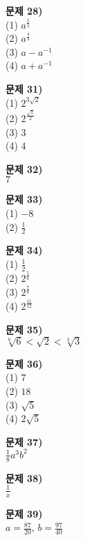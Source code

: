 \documentclass{oblivoir}
\newcommand\an[1]{\par\bigskip\noindent\textbf{문제 #1)}\\}
\begin{document}
\begin{minipage}{0.33\textwidth}

%
\an{28}
(1) \(a^{\frac52}\)\\
(2) \(a^{\frac43}\)\\
(3) \(a-a^{-1}\)\\
(4) \(a+a^{-1}\)

%
\an{31}
(1) \(2^{3\sqrt2}\)\\
(2) \(2^{\frac{\sqrt2}2}\)\\
(3) \(3\)\\
(4) \(4\)

%
\an{32}
\(7\)

%
\an{33}
(1) \(-8\)\\
(2) \(\frac12\)

%
\an{34}
(1) \(\frac12\)\\
(2) \(2^{\frac56}\)\\
(3) \(2^{\frac78}\)\\
(4) \(2^{\frac{11}{12}}\)

%
\an{35}
\(\sqrt[6]6<\sqrt2<\sqrt[3]3\)

%
\an{36}
(1) \(7\)\\
(2) \(18\)\\
(3) \(\sqrt5\)\\
(4) \(2\sqrt5\)
\end{minipage}

%
\an{37}
\(\frac18a^3b^2\)

%
\an{38}
\(\frac1x\)

%
\an{39}
\(a=\frac{87}{20}\), \(b=\frac{97}{40}\)
\end{document}
